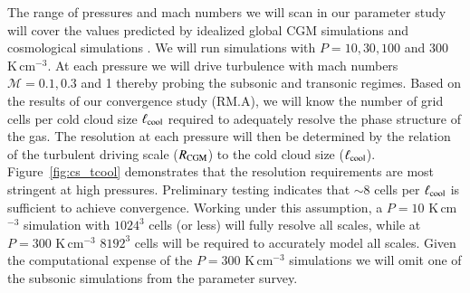 \documentclass[11pt,letterpaper,english]{article}
\begin{document}
The range of pressures and mach numbers we will scan in our parameter study will cover the values predicted by idealized global CGM simulations \cite{Fielding17} and cosmological simulations \cite{Nelson+16}. We will run simulations with $P = 10, 30, 100$ and 300 K\,cm$^{-3}$.  At each pressure we will drive turbulence with mach numbers $\mathcal{M} = 0.1, 0.3$ and 1 thereby probing the subsonic and transonic regimes. 
Based on the results of our convergence study (RM.A), we will know the number of grid cells per cold cloud size $\ell_{\rm cool}$ required to adequately resolve the phase structure of the gas.
The resolution at each pressure will then be determined by the relation of the turbulent driving scale ($R_{\rm CGM}$) to the cold cloud size ($\ell_{\rm cool}$).
Figure~\ref{fig:cs_tcool} demonstrates that the resolution requirements are most stringent at high pressures. Preliminary testing indicates that ${\sim}8 $ cells per $\ell_{\rm cool}$ is sufficient to achieve convergence. Working under this assumption, a $P=10$ K\,cm$^{-3}$ simulation with $1024^3$ cells (or less) will fully resolve all scales, while at $P=300$ K\,cm$^{-3}$ $8192^3$ cells will be required to accurately model all scales. Given the computational expense of the $P=300$ K\,cm$^{-3}$ simulations we will omit one of the subsonic simulations from the parameter survey.



\end{document}
